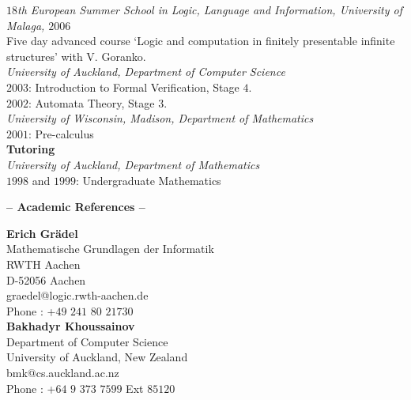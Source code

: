 \documentclass[a4paper]{article}
\def\tit#1{\medskip \begin{center}  {\Large {\bf -- #1 -- }} \end{center}}
\begin{document}
{\it $18$th European Summer School in Logic, Language and Information, University of Malaga, $2006$}\\
 Five day advanced course `Logic and computation in finitely presentable infinite structures'
 with V. Goranko.\\

 {\it University of Auckland, Department of Computer Science} \\
 $2003$: Introduction to Formal Verification, Stage $4$.\\
 $2002$: Automata Theory, Stage $3$.\\

 {\it University of Wisconsin, Madison, Department of Mathematics} \\
 $2001$: Pre-calculus\\
 

  {\bf Tutoring}\\
  {\it University of Auckland, Department of Mathematics} \\
  $1998$ and $1999$: Undergraduate Mathematics\\

\fi

\iffalse $1998$ and $1999$: Stages $1$, $2$ and $3$ in the Mathematics \\
	 $1999$: Assistant tutor for `Discrete Mathematics', Stage $2$
	Mathematics\\
	 $1999$: Demonstrator for `Combinatorial Computing', Stage $3$
	Mathematics\\
\fi
\tit{Academic References}


{\bf Erich Gr\"adel}\\
Mathematische Grundlagen der Informatik\\
RWTH Aachen\\
D-52056 Aachen\\
graedel@logic.rwth-aachen.de\\
Phone :	+$49$ $241$ $80$ $21730$\\

{\bf Bakhadyr Khoussainov}\\
Department of Computer Science\\
University of Auckland, New Zealand\\
bmk@cs.auckland.ac.nz\\
Phone : +$64$ $9$ $373$ $7599$ Ext $85120$\\
\end{document}
